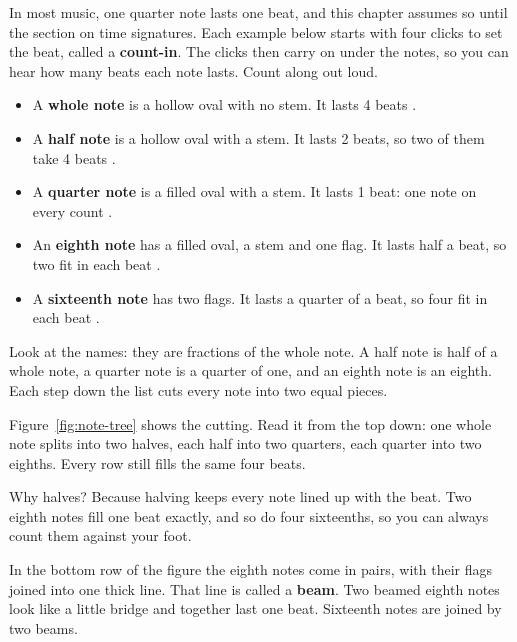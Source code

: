 In most music, one quarter note lasts one beat, and this chapter assumes so until the section on time signatures. Each example below starts with four clicks to set the beat, called a \textbf{count-in}. The clicks then carry on under the notes, so you can hear how many beats each note lasts. Count along out loud.
\begin{itemize}
  \item A \textbf{whole note} is a hollow oval with no stem. It lasts 4 beats .
  \item A \textbf{half note} is a hollow oval with a stem. It lasts 2 beats, so two of them take 4 beats .
  \item A \textbf{quarter note} is a filled oval with a stem. It lasts 1 beat: one note on every count .
  \item An \textbf{eighth note} has a filled oval, a stem and one flag. It lasts half a beat, so two fit in each beat .
  \item A \textbf{sixteenth note} has two flags. It lasts a quarter of a beat, so four fit in each beat .
\end{itemize}

Look at the names: they are fractions of the whole note. A half note is half of a whole note, a quarter note is a quarter of one, and an eighth note is an eighth. Each step down the list cuts every note into two equal pieces.

Figure~\ref{fig:note-tree} shows the cutting. Read it from the top down: one whole note splits into two halves, each half into two quarters, each quarter into two eighths. Every row still fills the same four beats.

Why halves? Because halving keeps every note lined up with the beat. Two eighth notes fill one beat exactly, and so do four sixteenths, so you can always count them against your foot.

In the bottom row of the figure the eighth notes come in pairs, with their flags joined into one thick line. That line is called a \textbf{beam}. Two beamed eighth notes look like a little bridge and together last one beat. Sixteenth notes are joined by two beams.


